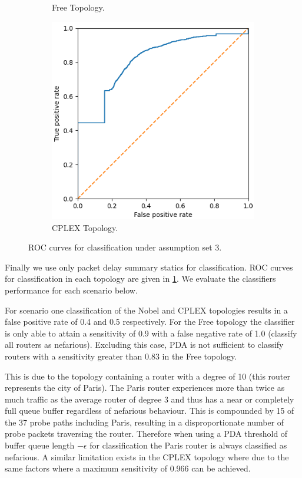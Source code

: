 \begin{figure}
\begin{subfigure}{0.475\textwidth}
        \caption{Free Topology.}
    \end{subfigure}
    \begin{subfigure}{0.475\textwidth}
        \includegraphics[width=\textwidth]{figs/results/norway_case3_roc.png}
        \caption{CPLEX Topology.}
    \end{subfigure}
    \caption{ROC curves for classification under assumption set 3.}
    \label{fig:RA3ROCcurves}
\end{figure}
Finally we use only packet delay summary statics for classification. ROC curves for classification in each topology are given in \cref{fig:RA3ROCcurves}. We evaluate the classifiers performance for each scenario below.\par
For scenario one classification of the Nobel and CPLEX topologies results in a false positive rate of 0.4 and 0.5 respectively. For the Free topology the classifier is only able to attain a sensitivity of 0.9 with a false negative rate of 1.0 (classify all routers as nefarious). Excluding this case, PDA is not sufficient to classify routers with a sensitivity greater than 0.83 in the Free topology.\par
This is due to the topology containing a router with a degree of 10 (this router represents the city of Paris). The Paris router experiences more than twice as much traffic as the average router of degree 3 and thus has a near or completely full queue buffer regardless of nefarious behaviour. This is compounded by 15 of the 37 probe paths including Paris, resulting in a disproportionate number of probe packets traversing the router. Therefore when using a PDA threshold of buffer queue length $-\epsilon$ for classification the Paris router is always classified as nefarious. A similar limitation exists in the CPLEX topology where due to the same factors where a maximum sensitivity of 0.966 can be achieved.\par
